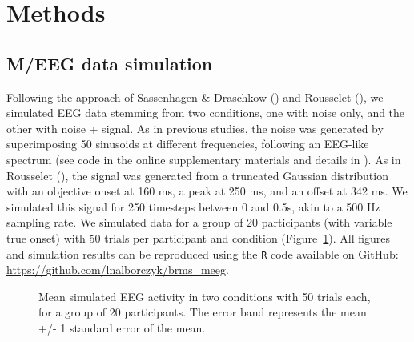 \documentclass[
  doc,
  floatsintext,
  longtable,
  a4paper,
  nolmodern,
  notxfonts,
  notimes,
  donotrepeattitle,
  colorlinks=true,linkcolor=blue,citecolor=blue,urlcolor=blue]{apa7}
\begin{document}
\section{Methods}\label{methods}

\subsection{M/EEG data simulation}\label{meeg-data-simulation}

Following the approach of Sassenhagen \& Draschkow
() and Rousselet
(), we simulated EEG data
stemming from two conditions, one with noise only, and the other with
noise + signal. As in previous studies, the noise was generated by
superimposing 50 sinusoids at different frequencies, following an
EEG-like spectrum (see code in the online supplementary materials and
details in ). As in
Rousselet (), the signal was
generated from a truncated Gaussian distribution with an objective onset
at 160 ms, a peak at 250 ms, and an offset at 342 ms. We simulated this
signal for 250 timesteps between 0 and 0.5s, akin to a 500 Hz sampling
rate. We simulated data for a group of 20 participants (with variable
true onset) with 50 trials per participant and condition
(Figure~\ref{fig-eeg}). All figures and simulation results can be
reproduced using the \texttt{R} code available on GitHub:
\url{https://github.com/lnalborczyk/brms_meeg}.

\begin{figure}[!htb]

\caption{\label{fig-eeg}Mean simulated EEG activity in two conditions
with 50 trials each, for a group of 20 participants. The error band
represents the mean +/- 1 standard error of the mean.}


\end{figure}%
\end{document}
